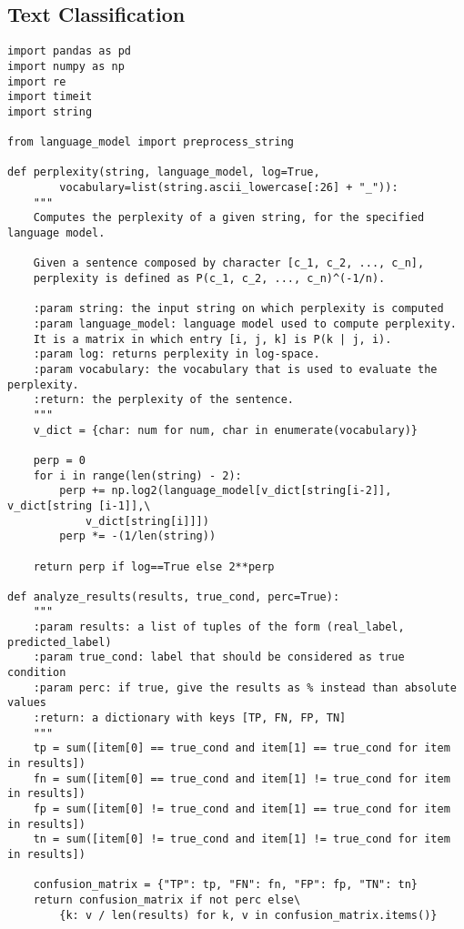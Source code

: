 \documentclass[
12pt,
a4paper,
oneside,
headinclude,
footinclude]{article}
\theoremstyle{definition} %
\begin{document}
\subsection{Text Classification}
\begin{verbatim}
import pandas as pd
import numpy as np
import re
import timeit
import string

from language_model import preprocess_string

def perplexity(string, language_model, log=True,
        vocabulary=list(string.ascii_lowercase[:26] + "_")):
    """
    Computes the perplexity of a given string, for the specified language model.
    
    Given a sentence composed by character [c_1, c_2, ..., c_n],
    perplexity is defined as P(c_1, c_2, ..., c_n)^(-1/n).
    
    :param string: the input string on which perplexity is computed
    :param language_model: language model used to compute perplexity.
    It is a matrix in which entry [i, j, k] is P(k | j, i).
    :param log: returns perplexity in log-space.
    :param vocabulary: the vocabulary that is used to evaluate the perplexity.
    :return: the perplexity of the sentence.
    """
    v_dict = {char: num for num, char in enumerate(vocabulary)}
    
    perp = 0
    for i in range(len(string) - 2):
        perp += np.log2(language_model[v_dict[string[i-2]], v_dict[string [i-1]],\
            v_dict[string[i]]])
        perp *= -(1/len(string))
    
    return perp if log==True else 2**perp

def analyze_results(results, true_cond, perc=True):
    """
    :param results: a list of tuples of the form (real_label, predicted_label)
    :param true_cond: label that should be considered as true condition
    :param perc: if true, give the results as % instead than absolute values
    :return: a dictionary with keys [TP, FN, FP, TN]
    """
    tp = sum([item[0] == true_cond and item[1] == true_cond for item in results])
    fn = sum([item[0] == true_cond and item[1] != true_cond for item in results])   
    fp = sum([item[0] != true_cond and item[1] == true_cond for item in results])
    tn = sum([item[0] != true_cond and item[1] != true_cond for item in results])
    
    confusion_matrix = {"TP": tp, "FN": fn, "FP": fp, "TN": tn}
    return confusion_matrix if not perc else\
        {k: v / len(results) for k, v in confusion_matrix.items()}


\end{verbatim}
\end{document}
